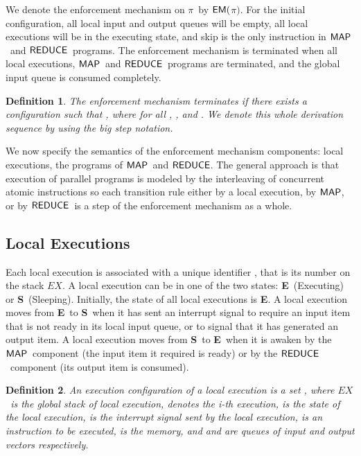 \documentclass[10pt,a4paper,oneside]{article}
\newtheorem{definition}{Definition}[section]
\def\sE{\textbf{E}}
\def\sS{\textbf{S}}
\def\ST{{\ensuremath{EX}}}
\def\sanserif#1{\ensuremath{\sf #1}}
\def\REDUCE{\ensuremath{\sanserif{REDUCE}}}
\def\MAP{\ensuremath{\sanserif{MAP}}}
\def\EM{\ensuremath{{\sanserif{EM}}}}
\def\Prog{\ensuremath{\pi}}
\def\EMP{\ensuremath{\EM(}\ensuremath{\Prog)}}
\begin{document}
We denote the enforcement mechanism on \Prog\ by \EMP. For the initial configuration, all local input and output queues will be empty, all local executions will be in the executing state, and skip is the only instruction in \MAP\ and \REDUCE\ programs. The enforcement mechanism is terminated when all local executions, \MAP\ and \REDUCE\ programs are terminated, and the global input queue is consumed completely.


\begin{definition}\label{def:termination:em}
The enforcement mechanism \emph{terminates} if there exists a configuration  such that , where  for all , , and . We denote this whole derivation sequence by  using the big step notation.
\end{definition}

\iffalse
\begin{definition}\label{def:termination:em}
The enforcement mechanism \emph{terminates} if there exists a configuration  such that , where  for all , , and . We denote this whole derivation sequence by  using the big step notation.
\end{definition}
\fi

We now specify the semantics of the enforcement mechanism components: local executions, the programs of \MAP\ and \REDUCE. The general approach is that execution of parallel programs is modeled by the interleaving of concurrent atomic instructions \cite{Lamport-83-SCP} so each transition rule either by a local execution, by \MAP, or by \REDUCE\ is a step of the enforcement mechanism as a whole.

\subsection{Local Executions}\label{sec:formalization:locExec}
Each local execution is associated with a unique identifier , that is its number on the stack \ST. A local execution can be in one of the two states: \sE\ (Executing) or \sS\ (Sleeping). Initially, the state of all local executions is \sE. A local execution moves from \sE\ to \sS\ when it has sent an interrupt signal to require an input item that is not ready in its local input queue, or to signal that it has generated an output item. A local execution moves from \sS\ to \sE\ when it is awaken by the \MAP\ component (the input item it required is ready) or by the \REDUCE\ component (its output item is consumed).



\begin{definition}\label{def:execConf:lec}
An execution configuration of a local execution is a set , where \ST\ is the global stack of local execution,  denotes the i-th execution,  is the state of the local execution,  is the interrupt signal sent by the local execution,  is an instruction to be executed,  is the memory, and  and  are queues of input and output vectors respectively.
\end{definition}
\end{document}
